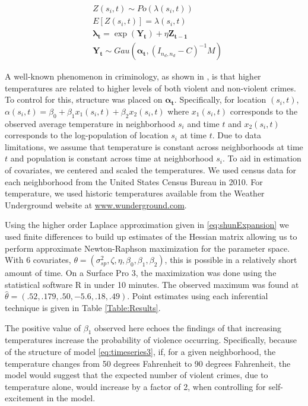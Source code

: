 \documentclass[11pt]{isuthesis}
\begin{document}
	\begin{align}
	& Z(s_i,t) \sim Po(\lambda(s_i,t)) \label{eq:timeseries3} \\
	& E[Z(s_i,t)]=\lambda(s_i,t)\\
	& \boldsymbol{\lambda_t} = \exp(\boldsymbol{Y_t})+\eta \boldsymbol{Z_{t-1}}\\
	& \boldsymbol{Y_t} \sim Gau (\boldsymbol{\alpha_t},(I_{{n_d},{n_d}}-C)^{-1}M)
	\end{align}
	
	A well-known phenomenon in criminology, as shown in \cite{anderson1987temperature}, is that higher temperatures are related to higher levels of both violent and non-violent crimes.  To control for this, structure was placed on $\boldsymbol{\alpha_t}$.  Specifically, for location $(s_i,t)$, $\alpha(s_i,t)=\beta_0 + \beta_1 x_1(s_i,t) + \beta_2 x_2(s_i,t)$ where $x_1(s_i,t)$ corresponds to the observed average temperature in neighborhood $s_i$ and time $t$ and $x_2(s_i,t)$ corresponds to the log-population of location $s_i$ at time $t$.  Due to data limitations, we assume that temperature is constant across neighborhoods at time $t$ and population is constant across time at neighborhood $s_i$.  To aid in estimation of covariates, we centered and scaled the temperatures. We used census data for each neighborhood from the United States Census Bureau in 2010.  For temperature, we used historic temperatures available from the Weather Underground website at \url{www.wunderground.com}.
	
	Using the higher order Laplace approximation given in \eqref{eq:shunExpansion} we used finite differences to build up estimates of the Hessian matrix allowing us to perform approximate Newton-Raphson maximization for the parameter space.  With 6 covariates, $\theta = (\sigma_{sp}^2,\zeta,\eta,\beta_0,\beta_1,\beta_2)$, this is possible in a relatively short amount of time.  On a Surface Pro 3, the maximization was done using the statistical software R in under 10 minutes.  The observed maximum was found at $\hat{\theta}=(.52,.179,.50,-5.6,.18,.49)$.  Point estimates using each inferential technique is given in Table \ref{Table:Results}. 
	
	The positive value of $\beta_1$ observed here echoes the findings of \cite{anderson1987temperature} that increasing temperatures increase the probability of violence occurring.  Specifically, because of the structure of model \eqref{eq:timeseries3}, 
	if, for a given neighborhood, the temperature changes from 50 degrees Fahrenheit to 90 degrees Fahrenheit, the model would suggest that the expected number of violent crimes, due to temperature alone, would increase by a factor of 2, when controlling for self-excitement in the model.  
	
\end{document}

